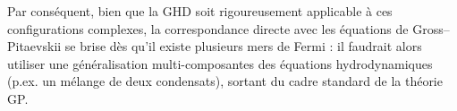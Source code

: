 {{\begin{Rema}
	Par conséquent, bien que la \gls{GHD} soit rigoureusement applicable à ces configurations complexes, la correspondance directe avec les équations de Gross–Pitaevskii se brise dès qu'il existe plusieurs mers de Fermi : il faudrait alors utiliser une générali\-sation multi-composantes des équations hydrodynamiques (p.ex. un mélange de deux condensats), sortant du cadre standard de la théorie \gls{GP}.
\end{Rema}
}
}




%
%
%


